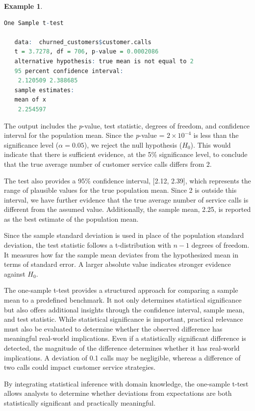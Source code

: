 \documentclass[
]{book}
\theoremstyle{definition}
\theoremstyle{definition}
\newtheorem{example}{Example}[chapter]
\theoremstyle{definition}
\theoremstyle{definition}
\theoremstyle{remark}
\begin{document}
\begin{example}
\begin{lstlisting}[language=R]
    One Sample t-test
   
   data:  churned_customers$customer.calls
   t = 3.7278, df = 706, p-value = 0.0002086
   alternative hypothesis: true mean is not equal to 2
   95 percent confidence interval:
    2.120509 2.388685
   sample estimates:
   mean of x 
    2.254597
\end{lstlisting}

The output includes the \emph{p}-value, test statistic, degrees of freedom, and confidence interval for the population mean. Since the \emph{p}-value = \ensuremath{2\times 10^{-4}} is less than the significance level (\(\alpha = 0.05\)), we reject the null hypothesis (\(H_0\)). This would indicate that there is sufficient evidence, at the 5\% significance level, to conclude that the true average number of customer service calls differs from 2.

The test also provides a 95\% confidence interval, {[}2.12, 2.39{]}, which represents the range of plausible values for the true population mean. Since 2 is outside this interval, we have further evidence that the true average number of service calls is different from the assumed value. Additionally, the sample mean, 2.25, is reported as the best estimate of the population mean.

Since the sample standard deviation is used in place of the population standard deviation, the test statistic follows a t-distribution with \(n - 1\) degrees of freedom. It measures how far the sample mean deviates from the hypothesized mean in terms of standard error. A larger absolute value indicates stronger evidence against \(H_0\).
\end{example}

The one-sample t-test provides a structured approach for comparing a sample mean to a predefined benchmark. It not only determines statistical significance but also offers additional insights through the confidence interval, sample mean, and test statistic. While statistical significance is important, practical relevance must also be evaluated to determine whether the observed difference has meaningful real-world implications. Even if a statistically significant difference is detected, the magnitude of the difference determines whether it has real-world implications. A deviation of 0.1 calls may be negligible, whereas a difference of two calls could impact customer service strategies.

By integrating statistical inference with domain knowledge, the one-sample t-test allows analysts to determine whether deviations from expectations are both statistically significant and practically meaningful.
\end{document}
